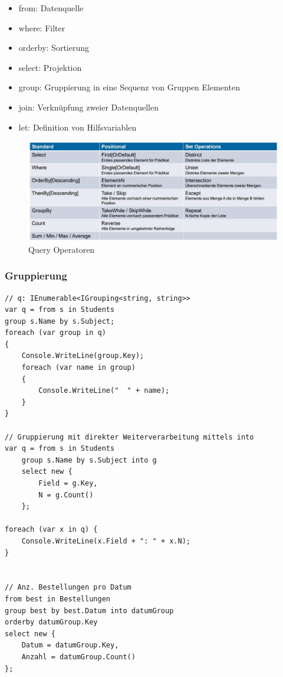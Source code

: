 \documentclass[
a4paper,
oneside,
10pt,
fleqn,
headsepline,
toc=listofnumbered, 
bibliography=totocnumbered]{scrartcl}
\begin{document}
\begin{itemize}
	\item from: Datenquelle
	\item where: Filter
	\item orderby: Sortierung
	\item select: Projektion
	\item group:  Gruppierung in eine Sequenz von Gruppen Elementen
	\item join: Verknüpfung zweier Datenquellen
	\item let: Definition von Hilfsvariablen
\end{itemize}

\begin{figure}[h]
\centering
\includegraphics[width=\linewidth]{images/linq_query_operatoren}
\caption{Query Operatoren}
\label{fig:linqqueryoperatoren}
\end{figure}

\newpage

\subsubsection{Gruppierung}
\begin{lstlisting}
// q: IEnumerable<IGrouping<string, string>>
var q = from s in Students
group s.Name by s.Subject;
foreach (var group in q)
{
	Console.WriteLine(group.Key);
	foreach (var name in group)
	{
		Console.WriteLine("  " + name);
	}
}

// Gruppierung mit direkter Weiterverarbeitung mittels into
var q = from s in Students
	group s.Name by s.Subject into g
	select new {
		Field = g.Key,
		N = g.Count()
	};

foreach (var x in q) {
	Console.WriteLine(x.Field + ": " + x.N);
}


// Anz. Bestellungen pro Datum
from best in Bestellungen
group best by best.Datum into datumGroup
orderby datumGroup.Key
select new {
	Datum = datumGroup.Key,
	Anzahl = datumGroup.Count()
};
\end{lstlisting}
\end{document}
